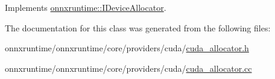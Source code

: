 Implements \mbox{\hyperlink{classonnxruntime_1_1IDeviceAllocator_a46b848cd863bcd50d1e63d48ad96c63c}{onnxruntime\+::\+I\+Device\+Allocator}}.



The documentation for this class was generated from the following files\+:\begin{DoxyCompactItemize}
\item 
onnxruntime/onnxruntime/core/providers/cuda/\mbox{\hyperlink{cuda__allocator_8h}{cuda\+\_\+allocator.\+h}}\item 
onnxruntime/onnxruntime/core/providers/cuda/\mbox{\hyperlink{cuda__allocator_8cc}{cuda\+\_\+allocator.\+cc}}\end{DoxyCompactItemize}
